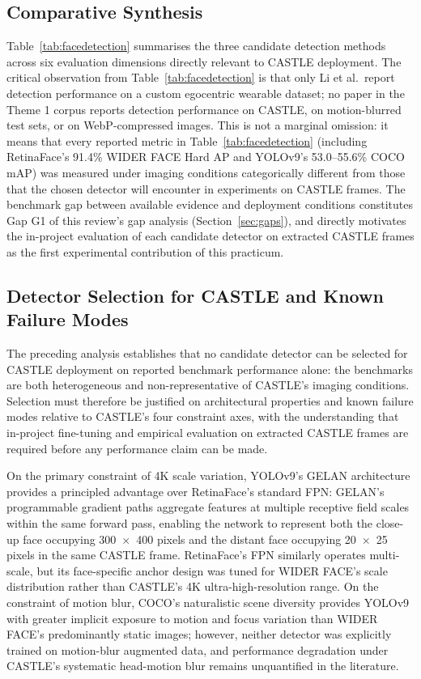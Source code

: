 \documentclass[12pt, onecolumn]{IEEEtran}
\begin{document}
\subsection{Comparative Synthesis}

Table~\ref{tab:facedetection} summarises the three candidate detection methods across six evaluation dimensions directly relevant
to CASTLE deployment. The critical observation from Table~\ref{tab:facedetection} is that only Li et al.\ report detection performance on a custom egocentric wearable dataset; no paper in the Theme 1 corpus reports detection performance on CASTLE, on motion-blurred test sets, or on WebP-compressed images. This
is not a marginal omission: it means that every reported metric in Table~\ref{tab:facedetection} (including RetinaFace's
91.4\% WIDER FACE Hard AP and YOLOv9's 53.0--55.6\% COCO mAP) was measured under imaging conditions
categorically different from those that the chosen detector will encounter in experiments on CASTLE frames.
The benchmark gap between available evidence and deployment conditions constitutes Gap G1 of this review's
gap analysis (Section~\ref{sec:gaps}), and directly motivates the in-project evaluation of each candidate detector on
extracted CASTLE frames as the first experimental contribution of this practicum.

\subsection{Detector Selection for CASTLE and Known Failure Modes}

The preceding analysis establishes that no candidate detector can be selected for CASTLE deployment on
reported benchmark performance alone: the benchmarks are both heterogeneous and non-representative of
CASTLE's imaging conditions. Selection must therefore be justified on architectural properties and known
failure modes relative to CASTLE's four constraint axes, with the understanding that in-project fine-tuning
and empirical evaluation on extracted CASTLE frames are required before any performance claim can be made.

On the primary constraint of 4K scale variation, YOLOv9's GELAN architecture provides a principled advantage
over RetinaFace's standard FPN: GELAN's programmable gradient paths aggregate features at multiple receptive
field scales within the same forward pass, enabling the network to represent both the close-up face
occupying 300~$\times$~400 pixels and the distant face occupying 20~$\times$~25 pixels in the same CASTLE frame.
RetinaFace's FPN similarly operates multi-scale, but its face-specific anchor design was tuned for WIDER
FACE's scale distribution rather than CASTLE's 4K ultra-high-resolution range. On the constraint of
motion blur, COCO's naturalistic scene diversity provides YOLOv9 with greater implicit exposure to motion and
focus variation than WIDER FACE's predominantly static images; however, neither detector was
explicitly trained on motion-blur augmented data, and performance degradation under CASTLE's systematic
head-motion blur remains unquantified in the literature.
\end{document}

